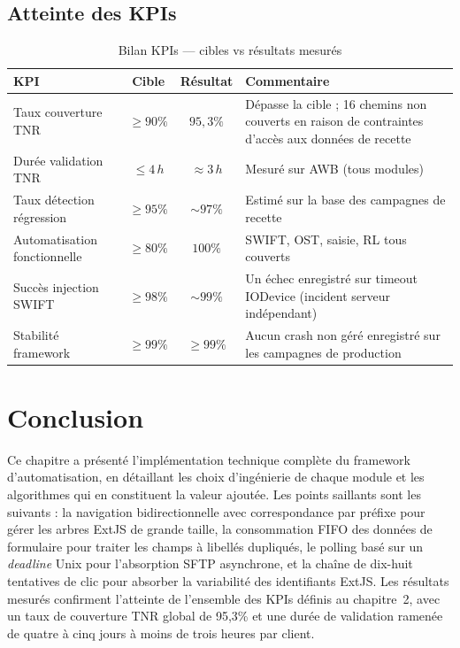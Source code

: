 \documentclass[12pt, a4paper]{report}
\begin{document}
\subsection{Atteinte des KPIs}

\begin{table}[H]
\centering
\caption{Bilan KPIs — cibles vs résultats mesurés}
\label{tab:kpi_results}
\begin{tabularx}{\textwidth}{lccX}
\toprule
\textbf{KPI} & \textbf{Cible} & \textbf{Résultat} & \textbf{Commentaire} \\
\midrule
Taux couverture TNR          & $\geq 90\%$    & $95,3\%$     & Dépasse la cible ; 16 chemins non couverts en raison de contraintes d'accès aux données de recette \\
Durée validation TNR         & $\leq 4\,h$    & $\approx 3\,h$ & Mesuré sur AWB (tous modules) \\
Taux détection régression    & $\geq 95\%$    & $\sim 97\%$  & Estimé sur la base des campagnes de recette \\
Automatisation fonctionnelle & $\geq 80\%$    & $100\%$      & SWIFT, OST, saisie, RL tous couverts \\
Succès injection SWIFT       & $\geq 98\%$    & $\sim 99\%$  & Un échec enregistré sur timeout IODevice (incident serveur indépendant) \\
Stabilité framework          & $\geq 99\%$    & $\geq 99\%$  & Aucun crash non géré enregistré sur les campagnes de production \\
\bottomrule
\end{tabularx}
\end{table}

\section*{Conclusion}

Ce chapitre a présenté l'implémentation technique complète du framework d'automatisation, en détaillant les choix d'ingénierie de chaque module et les algorithmes qui en constituent la valeur ajoutée. Les points saillants sont les suivants : la navigation bidirectionnelle avec correspondance par préfixe pour gérer les arbres ExtJS de grande taille, la consommation FIFO des données de formulaire pour traiter les champs à libellés dupliqués, le polling basé sur un \textit{deadline} Unix pour l'absorption SFTP asynchrone, et la chaîne de dix-huit tentatives de clic pour absorber la variabilité des identifiants ExtJS. Les résultats mesurés confirment l'atteinte de l'ensemble des KPIs définis au chapitre~2, avec un taux de couverture TNR global de 95,3\% et une durée de validation ramenée de quatre à cinq jours à moins de trois heures par client.
\end{document}
